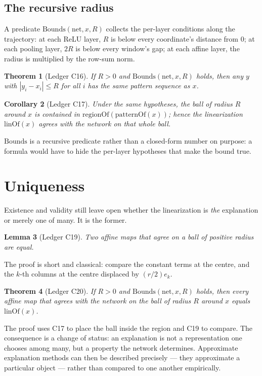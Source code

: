 \documentclass[11pt]{article}
\newtheorem{theorem}{Theorem}
\newtheorem{lemma}[theorem]{Lemma}
\newtheorem{corollary}[theorem]{Corollary}
\newcommand{\LinOf}{\mathrm{linOf}}
\newcommand{\PatOf}{\mathrm{patternOf}}
\newcommand{\RegOf}{\mathrm{regionOf}}
\begin{document}
\subsection{The recursive radius}

A predicate $\mathrm{Bounds}(\mathrm{net}, x, R)$ collects the per-layer
conditions along the trajectory: at each ReLU layer, $R$ is below every
coordinate's distance from $0$; at each pooling layer, $2R$ is below every
window's gap; at each affine layer, the radius is multiplied by the row-sum
norm.

\begin{theorem}[Ledger C16]
If $R > 0$ and $\mathrm{Bounds}(\mathrm{net}, x, R)$ holds, then any $y$ with
$|y_i - x_i| \le R$ for all $i$ has the same pattern sequence as $x$.
\end{theorem}

\begin{corollary}[Ledger C17]
Under the same hypotheses, the ball of radius $R$ around $x$ is contained in
$\RegOf(\PatOf(x))$; hence the linearization $\LinOf(x)$ agrees with the network on
that whole ball.
\end{corollary}

$\mathrm{Bounds}$ is a recursive predicate rather than a closed-form number on
purpose: a formula would have to hide the per-layer hypotheses that make the
bound true.

\section{Uniqueness}

Existence and validity still leave open whether the linearization is \emph{the}
explanation or merely one of many. It is the former.

\begin{lemma}[Ledger C19]
Two affine maps that agree on a ball of positive radius are equal.
\end{lemma}

The proof is short and classical: compare the constant terms at the centre, and
the $k$-th columns at the centre displaced by $(r/2)e_k$.

\begin{theorem}[Ledger C20]
If $R > 0$ and $\mathrm{Bounds}(\mathrm{net},x,R)$ holds, then every affine map
that agrees with the network on the ball of radius $R$ around $x$ \emph{equals}
$\LinOf(x)$.
\end{theorem}

The proof uses C17 to place the ball inside the region and C19 to compare.
The consequence is a change of status: an explanation is not a representation
one chooses among many, but a property the network determines. Approximate
explanation methods can then be described precisely --- they approximate a
particular object --- rather than compared to one another empirically.
\end{document}
